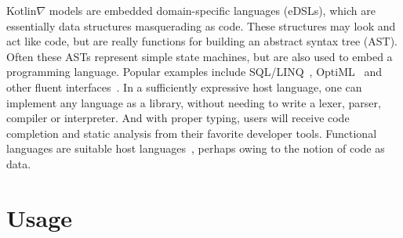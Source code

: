 \documentclass[12pt,initial,twoside,maitrise]{dms}
\numberwithin{equation}{section}
\numberwithin{table}{chapter}
\numberwithin{figure}{chapter}
\begin{document}
Kotlin$\nabla$ models are embedded domain-specific languages (eDSLs), which are essentially data structures masquerading as code. These structures may look and act like code, but are really functions for building an abstract syntax tree (AST). Often these ASTs represent simple state machines, but are also used to embed a programming language. Popular examples include SQL/LINQ~\citep{meijer2006linq}, OptiML~\citep{sujeeth2011optiml} and other fluent interfaces~\citep{fowler05fluent}. In a sufficiently expressive host language, one can implement any language as a library, without needing to write a lexer, parser, compiler or interpreter. And with proper typing, users will receive code completion and static analysis from their favorite developer tools. Functional languages are suitable host languages~\citep{elliott2003compiling,rompf2010lightweight}, perhaps owing to the notion of code as data.%

\section{Usage}
\end{document}
